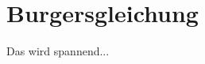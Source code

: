 \documentclass{book}
\begin{document}
	
	\section{Burgersgleichung}
	Das wird spannend...
\end{document}
